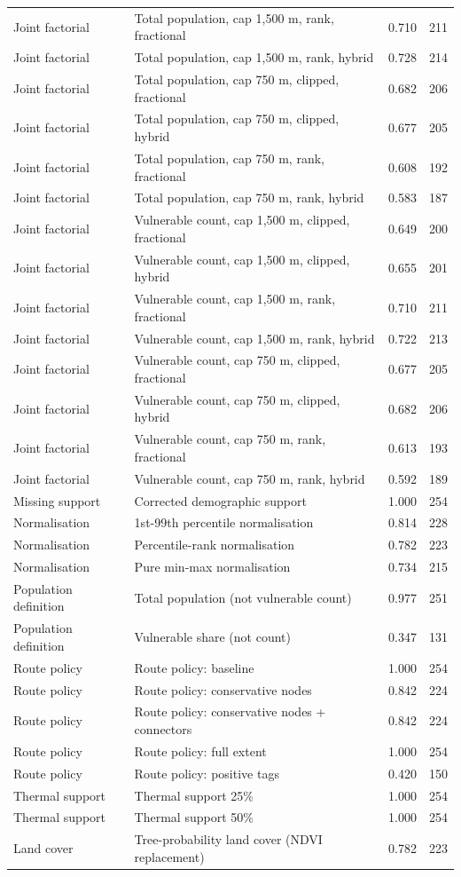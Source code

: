 \begin{longtable}{@{}p{} p{} r r@{}}
Joint factorial & Total population, cap 1,500 m, rank, fractional & 0.710 & 211 \\
Joint factorial & Total population, cap 1,500 m, rank, hybrid & 0.728 & 214 \\
Joint factorial & Total population, cap 750 m, clipped, fractional & 0.682 & 206 \\
Joint factorial & Total population, cap 750 m, clipped, hybrid & 0.677 & 205 \\
Joint factorial & Total population, cap 750 m, rank, fractional & 0.608 & 192 \\
Joint factorial & Total population, cap 750 m, rank, hybrid & 0.583 & 187 \\
Joint factorial & Vulnerable count, cap 1,500 m, clipped, fractional & 0.649 & 200 \\
Joint factorial & Vulnerable count, cap 1,500 m, clipped, hybrid & 0.655 & 201 \\
Joint factorial & Vulnerable count, cap 1,500 m, rank, fractional & 0.710 & 211 \\
Joint factorial & Vulnerable count, cap 1,500 m, rank, hybrid & 0.722 & 213 \\
Joint factorial & Vulnerable count, cap 750 m, clipped, fractional & 0.677 & 205 \\
Joint factorial & Vulnerable count, cap 750 m, clipped, hybrid & 0.682 & 206 \\
Joint factorial & Vulnerable count, cap 750 m, rank, fractional & 0.613 & 193 \\
Joint factorial & Vulnerable count, cap 750 m, rank, hybrid & 0.592 & 189 \\
Missing support & Corrected demographic support & 1.000 & 254 \\
Normalisation & 1st-99th percentile normalisation & 0.814 & 228 \\
Normalisation & Percentile-rank normalisation & 0.782 & 223 \\
Normalisation & Pure min-max normalisation & 0.734 & 215 \\
Population definition & Total population (not vulnerable count) & 0.977 & 251 \\
Population definition & Vulnerable share (not count) & 0.347 & 131 \\
Route policy & Route policy: baseline & 1.000 & 254 \\
Route policy & Route policy: conservative nodes & 0.842 & 224 \\
Route policy & Route policy: conservative nodes + connectors & 0.842 & 224 \\
Route policy & Route policy: full extent & 1.000 & 254 \\
Route policy & Route policy: positive tags & 0.420 & 150 \\
Thermal support & Thermal support 25\% & 1.000 & 254 \\
Thermal support & Thermal support 50\% & 1.000 & 254 \\
Land cover & Tree-probability land cover (NDVI replacement) & 0.782 & 223 \\
\end{longtable}